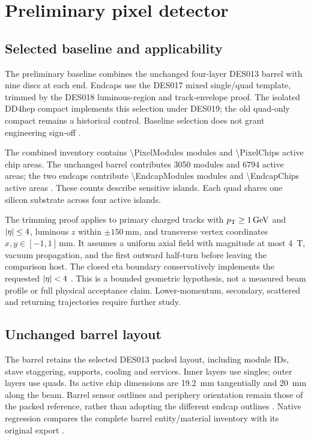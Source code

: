 \chapter{Preliminary pixel detector}
\label{ch:pixel}


\section{Selected baseline and applicability}
The preliminary baseline combines the unchanged four-layer DES013 barrel with
nine discs at each end. Endcaps use the DES017 mixed single/quad template,
trimmed by the DES018 luminous-region and track-envelope proof. The isolated
DD4hep compact implements this selection under DES019; the old quad-only
compact remains a historical control. Baseline selection does not grant
engineering sign-off \cite{barrel,mixed,trim,model}.

The combined inventory contains \num{\PixelModules} modules and
\num{\PixelChips} active chip areas. The unchanged barrel contributes
\num{3050} modules and \num{6794} active areas; the two endcaps contribute
\num{\EndcapModules} modules and \num{\EndcapChips} active areas
\cite{barrel,model}. These counts describe sensitive islands. Each quad shares
one silicon substrate across four active islands.

The trimming proof applies to primary charged tracks with
$p_{\mathrm{T}}\geq\qty{1}{\giga\electronvolt}$ and $|\eta|\leq4$, luminous
$z$ within $\pm\qty{150}{\milli\metre}$, and transverse vertex coordinates
$x,y\in[-1,1]\,\unit{\milli\metre}$. It assumes a uniform axial field
with magnitude at most \qty{4}{\tesla}, vacuum propagation, and the first
outward half-turn before leaving the comparison host. The closed eta boundary
conservatively implements the requested $|\eta|<4$ \cite{trim}.
This is a bounded geometric hypothesis, not a measured beam profile or full
physical acceptance claim. Lower-momentum, secondary, scattered and returning
trajectories require further study.

\section{Unchanged barrel layout}
The barrel retains the selected DES013 packed layout, including module IDs,
stave staggering, supports, cooling and services. Inner layers use singles;
outer layers use quads. Its active chip dimensions are
\qty{19.2}{\milli\metre} tangentially and \qty{20}{\milli\metre} along the
beam. Barrel sensor outlines and periphery orientation remain those of the
packed reference, rather than adopting the different endcap outlines
\cite{barrel}. Native regression compares the complete barrel entity/material
inventory with its original export \cite{model}.

